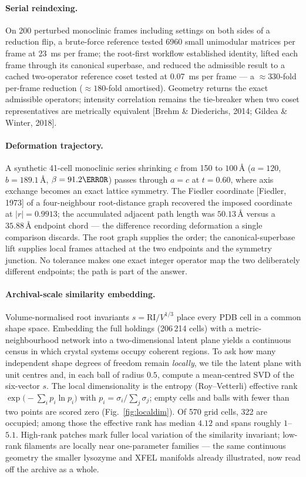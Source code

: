\documentclass[11pt]{article}
\newcommand{\Ang}{\text{\AA}}
\begin{document}
\paragraph{Serial reindexing.}
On 200 perturbed monoclinic frames including settings on both sides of a
reduction flip, a brute-force reference tested 6960 small unimodular matrices per
frame at \SI{23}{\milli\second} per frame; the root-first workflow established
identity, lifted each frame through its canonical superbase, and reduced the
admissible result to a cached two-operator reference coset tested at
\SI{0.07}{\milli\second} per frame --- a $\approx 330$-fold per-frame reduction
($\approx 180$-fold amortised). Geometry returns the exact admissible operators;
intensity correlation remains the tie-breaker when two coset representatives are
metrically equivalent [Brehm \& Diederichs, 2014; Gildea \& Winter, 2018].

\paragraph{Deformation trajectory.}
A synthetic 41-cell monoclinic series shrinking $c$ from 150 to $100\,\Ang$
($a = 120$, $b = 189.1\,\Ang$, $\beta = 91.2\degree$) passes through $a = c$ at
$t = 0.60$, where axis exchange becomes an exact lattice symmetry. The Fiedler
coordinate [Fiedler, 1973] of a four-neighbour root-distance graph recovered the
imposed coordinate at $|r| = 0.9913$; the accumulated adjacent path length was
$50.13\,\Ang$ versus a $35.88\,\Ang$ endpoint chord --- the difference recording
deformation a single comparison discards. The root graph supplies the order; the
canonical-superbase lift supplies local frames attached at the two endpoints and
the symmetry junction. No tolerance makes one exact integer operator map the two
deliberately different endpoints; the path is part of the answer.

\paragraph{Archival-scale similarity embedding.}
Volume-normalised root invariants $s = \mathrm{RI}/V^{1/3}$ place every PDB
cell in a common shape space. Embedding the full holdings (206\,214 cells) with
a metric-neighbourhood network into a two-dimensional latent plane yields a
continuous census in which crystal systems occupy coherent regions. To ask how
many independent shape degrees of freedom remain \emph{locally}, we tile the
latent plane with unit centres and, in each ball of radius $0.5$, compute a
mean-centred SVD of the six-vector $s$. The local dimensionality is the
entropy (Roy--Vetterli) effective rank
$\exp\bigl(-\sum_i p_i\ln p_i\bigr)$ with $p_i=\sigma_i/\sum_j\sigma_j$; empty
cells and balls with fewer than two points are scored zero
(Fig.~\ref{fig:localdim}). Of 570 grid cells, 322 are occupied; among those the
effective rank has median $4.12$ and spans roughly $1$--$5.1$. High-rank
patches mark fuller local variation of the similarity invariant; low-rank
filaments are locally near one-parameter families --- the same continuous
geometry the smaller lysozyme and XFEL manifolds already illustrated, now read
off the archive as a whole.
\end{document}
